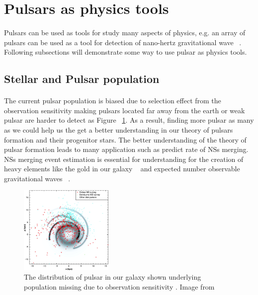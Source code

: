 \documentclass[thesis_msc.tex]{subfiles}
\begin{document}
\section{Pulsars as physics tools}
    \paragraph{} Pulsars can be used as tools for study many aspects of physics, e.g. an array of pulsars can be used as a tool for detection of nano-hertz gravitational wave ~\citep{doi:10.1093/mnras/stw347}. Following subsections will demonstrate some way to use pulsar as physics tools.  

    \subsection{Stellar and Pulsar population} 
    \paragraph{} The current pulsar population is biased due to selection effect from the observation sensitivity making pulsars located far away from the earth or weak pulsar are harder to detect as Figure ~\ref{pdist}. As a result, finding more pulsar as many as we could help us the get a better understanding in our theory of pulsars formation and their progenitor stars. The better understanding of the theory of pulsar formation leads to many application such as predict rate of NSs merging. NSs merging event estimation is essential for understanding for the creation of heavy elements like the gold in our galaxy ~\citep{Thielemann:2017acv} and expected number observable gravitational waves ~\citep{0034-4885-72-7-076901}.
        \begin{figure}[h] \centering
\includegraphics[width=0.4\textwidth]{figures/F1_large.jpg}
\caption{The distribution of pulsar in our galaxy shown underlying population missing due to observation sensitivity . Image from \citep{Manchester542}  }
\label{pdist}
\end{figure}
\end{document}
